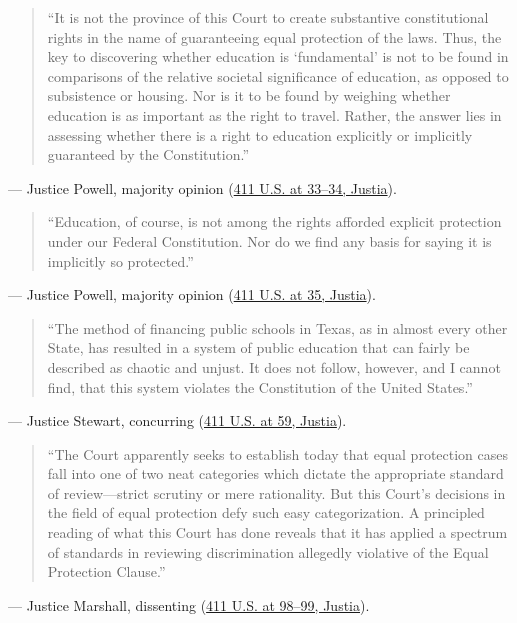 \documentclass[12pt]{article}
\begin{document}
\begin{quote}
``It is not the province of this Court to create substantive constitutional rights in the name of guaranteeing equal protection of the laws. Thus, the key to discovering whether education is `fundamental' is not to be found in comparisons of the relative societal significance of education, as opposed to subsistence or housing. Nor is it to be found by weighing whether education is as important as the right to travel. Rather, the answer lies in assessing whether there is a right to education explicitly or implicitly guaranteed by the Constitution.''
\end{quote}
\noindent --- Justice Powell, majority opinion (\href{https://supreme.justia.com/cases/federal/us/411/1/}{411 U.S. at 33--34, Justia}).

\begin{quote}
``Education, of course, is not among the rights afforded explicit protection under our Federal Constitution. Nor do we find any basis for saying it is implicitly so protected.''
\end{quote}
\noindent --- Justice Powell, majority opinion (\href{https://supreme.justia.com/cases/federal/us/411/1/}{411 U.S. at 35, Justia}).

\begin{quote}
``The method of financing public schools in Texas, as in almost every other State, has resulted in a system of public education that can fairly be described as chaotic and unjust. It does not follow, however, and I cannot find, that this system violates the Constitution of the United States.''
\end{quote}
\noindent --- Justice Stewart, concurring (\href{https://supreme.justia.com/cases/federal/us/411/1/}{411 U.S. at 59, Justia}).

\begin{quote}
``The Court apparently seeks to establish today that equal protection cases fall into one of two neat categories which dictate the appropriate standard of review---strict scrutiny or mere rationality. But this Court's decisions in the field of equal protection defy such easy categorization. A principled reading of what this Court has done reveals that it has applied a spectrum of standards in reviewing discrimination allegedly violative of the Equal Protection Clause.''
\end{quote}
\noindent --- Justice Marshall, dissenting (\href{https://supreme.justia.com/cases/federal/us/411/1/}{411 U.S. at 98--99, Justia}).
\end{document}

